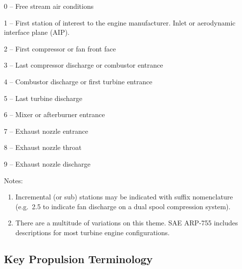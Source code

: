 \documentclass[
]{book}
\begin{document}
0 -- Free stream air conditions

1 -- First station of interest to the engine manufacturer. Inlet or aerodynamic
interface plane (AIP).

2 -- First compressor or fan front face

3 -- Last compressor discharge or combustor entrance

4 -- Combustor discharge or first turbine entrance

5 -- Last turbine discharge

6 -- Mixer or afterburner entrance

7 -- Exhaust nozzle entrance

8 -- Exhaust nozzle throat

9 -- Exhaust nozzle discharge

Notes:

\begin{enumerate}
\def\labelenumi{\arabic{enumi}.}
\item
  Incremental (or sub) stations may be indicated with suffix nomenclature
  (e.g.~2.5 to indicate fan discharge on a dual spool compression system).
\item
  There are a multitude of variations on this theme. SAE ARP-755 includes
  descriptions for most turbine engine configurations.
\end{enumerate}

\hypertarget{key-propulsion-terminology}{%
\subsection{Key Propulsion Terminology}\label{key-propulsion-terminology}}
\end{document}
